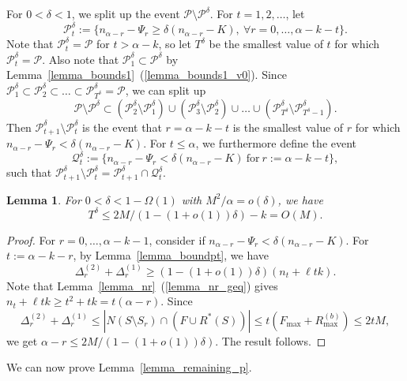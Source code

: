 \documentclass{article}
\theoremstyle{plain}
\theoremstyle{remark}
\theoremstyle{plain}
\newtheorem{lemma}[theorem]{Lemma}
\numberwithin{equation}{section}
\begin{document}
	For $0<\delta<1$, we split up the event $\mathcal{P}\setminus\mathcal{P}^{\delta}$. For $t=1,2,\ldots$, let $$\mathcal{P}_t^{\delta}:=\{n_{\alpha-r}-\Psi_r\geq\delta(n_{\alpha-r}-K),\ \forall r=0,\ldots,\alpha-k-t\}.$$ Note that $\mathcal{P}_t^{\delta}=\mathcal{P}$ for $t>\alpha-k$, so let $T^{\delta}$ be the smallest value of $t$ for which $\mathcal{P}_t^{\delta}=\mathcal{P}$. Also note that $\mathcal{P}_1^{\delta}\subset\mathcal{P}^{\delta}$ by Lemma~\ref{lemma_bounds1}~(\ref{lemma_bounds1_v0}). Since $\mathcal{P}_1^{\delta}\subset\mathcal{P}_2^{\delta}\subset\ldots\subset\mathcal{P}_{T^{\delta}}^{\delta}=\mathcal{P}$, we can split up $$\mathcal{P}\setminus\mathcal{P}^{\delta}\subset(\mathcal{P}_2^{\delta}\setminus\mathcal{P}_1^{\delta})\cup(\mathcal{P}_3^{\delta}\setminus\mathcal{P}_2^{\delta})\cup\ldots\cup(\mathcal{P}_{T^{\delta}}^{\delta}\setminus\mathcal{P}_{T^{\delta}-1}^{\delta}).$$ Then $\mathcal{P}_{t+1}^{\delta}\setminus\mathcal{P}_t^{\delta}$ is the event that $r=\alpha-k-t$ is the smallest value of $r$ for which $n_{\alpha-r}-\Psi_r<\delta(n_{\alpha-r}-K)$. For $t\leq\alpha$, we furthermore define the event $$\mathcal{Q}_t^{\delta}:=\{n_{\alpha-r}-\Psi_r<\delta(n_{\alpha-r}-K)\ \text{for}\ r:=\alpha-k-t\},$$ such that $\mathcal{P}_{t+1}^{\delta}\setminus\mathcal{P}_t^{\delta}=\mathcal{P}_{t+1}^{\delta}\cap\mathcal{Q}_t^{\delta}$.
	
	\begin{lemma}\label{lemma_t}
		For $0<\delta<1-\Omega(1)$ with $M^2/\alpha=o(\delta)$, we have $$T^{\delta}\leq2M/(1-(1+o(1))\delta)-k=O(M).$$
	\end{lemma}
	
	\begin{proof}
		For $r=0,\ldots,\alpha-k-1$, consider if $n_{\alpha-r}-\Psi_r<\delta(n_{\alpha-r}-K)$. For $t:=\alpha-k-r$, by Lemma~\ref{lemma_boundpt}, we have $$\Delta_r^{(2)}+\Delta_r^{(1)}\geq(1-(1+o(1))\delta)(n_t+\ell tk).$$ Note that Lemma~\ref{lemma_nr}~(\ref{lemma_nr_geq}) gives $n_t+\ell tk\geq t^2+tk=t(\alpha-r)$. Since $$\Delta_r^{(2)}+\Delta_r^{(1)}\leq|N(S\setminus S_r)\cap(F\cup R^*(S))|\leq t(F_{\max}+R_{\max}^{(b)})\leq 2tM,$$ we get $\alpha-r\leq 2M/(1-(1+o(1))\delta)$. The result follows.
	\end{proof}
	
	We can now prove Lemma~\ref{lemma_remaining_p}.
	
\end{document}
